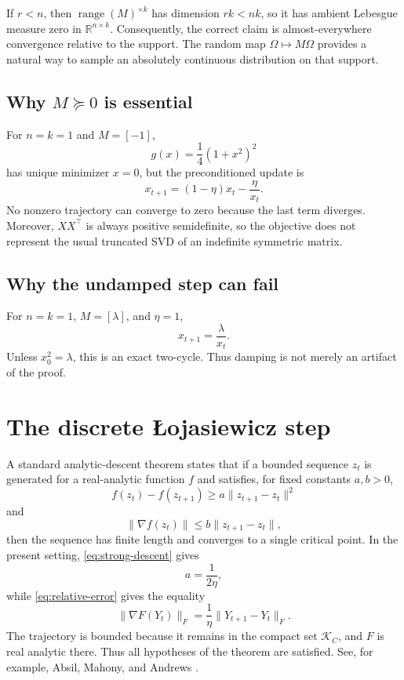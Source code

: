 \documentclass[11pt]{article}
\newcommand{\RR}{\mathbb{R}}
\newcommand{\range}{\operatorname{range}}
\newcommand{\cK}{\mathcal{K}}
\begin{document}
If \(r<n\), then \(\range(M)^{\times k}\) has dimension \(rk<nk\), so it has
ambient Lebesgue measure zero in \(\RR^{n\times k}\). Consequently, the correct
claim is almost-everywhere convergence relative to the support. The random map
\(\Omega\mapsto M\Omega\) provides a natural way to sample an absolutely
continuous distribution on that support.

\subsection{Why \texorpdfstring{\(M\succeq0\)}{positive semidefiniteness} is essential}

For \(n=k=1\) and \(M=[-1]\),
\[
g(x)=\frac14(1+x^2)^2
\]
has unique minimizer \(x=0\), but the preconditioned update is
\[
x_{t+1}
=
(1-\eta)x_t-\frac{\eta}{x_t}.
\]
No nonzero trajectory can converge to zero because the last term diverges.
Moreover, \(XX^\top\) is always positive semidefinite, so the objective does
not represent the usual truncated SVD of an indefinite symmetric matrix.

\subsection{Why the undamped step can fail}

For \(n=k=1\), \(M=[\lambda]\), and \(\eta=1\),
\[
x_{t+1}=\frac{\lambda}{x_t}.
\]
Unless \(x_0^2=\lambda\), this is an exact two-cycle. Thus damping is not merely
an artifact of the proof.

\section{The discrete \L{}ojasiewicz step}
\label{app:loj}

A standard analytic-descent theorem states that if a bounded sequence
\(z_t\) is generated for a real-analytic function \(f\) and satisfies, for
fixed constants \(a,b>0\),
\[
f(z_t)-f(z_{t+1})
\ge
a\|z_{t+1}-z_t\|^2
\]
and
\[
\|\nabla f(z_t)\|
\le
b\|z_{t+1}-z_t\|,
\]
then the sequence has finite length and converges to a single critical point.
In the present setting, \eqref{eq:strong-descent} gives
\[
a=\frac{1}{2\eta},
\]
while \eqref{eq:relative-error} gives the equality
\[
\|\nabla F(Y_t)\|_F
=
\frac1\eta\|Y_{t+1}-Y_t\|_F.
\]
The trajectory is bounded because it remains in the compact set \(\cK_C\),
and \(F\) is real analytic there. Thus all hypotheses of the theorem are
satisfied. See, for example, Absil, Mahony, and Andrews
\cite{absil2005convergence}.
\end{document}
